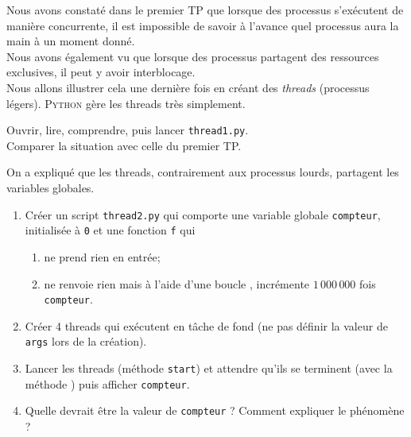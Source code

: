\documentclass[a4paper,12pt,french]{book}
\begin{document}

Nous avons constaté dans le premier TP que lorsque des processus s'exécutent de manière concurrente, il est impossible de savoir à l'avance quel processus aura la main à un moment donné.\\

Nous avons également vu que lorsque des processus partagent des ressources exclusives, il peut y avoir interblocage.\\

Nous allons illustrer cela une dernière fois en créant des \textit{threads} (processus légers). \textsc{Python} gère les threads très simplement.

\begin{exercice}[]
Ouvrir, lire, comprendre, puis lancer \texttt{thread1.py}.\\
Comparer la situation avec celle du premier TP.
\end{exercice}

\begin{exercice}[]
On a expliqué que les threads, contrairement aux processus \og lourds\fg{}, partagent les variables globales.
\begin{enumerate}[\bfseries 1.]
	\item 	Créer un script \texttt{thread2.py} qui comporte une variable globale \texttt{compteur}, initialisée à \texttt{0} et une fonction \texttt{f} qui
            \begin{enumerate}[--]
            	\item 	ne prend rien en entrée;
            	\item 	ne renvoie rien mais à l'aide d'une boucle , incrémente $1\,000\,000$ fois \texttt{compteur}.
            \end{enumerate}
	\item 	Créer 4 threads qui exécutent  en tâche de fond (ne pas définir la valeur de \texttt{args} lors de la création).
    \item 	Lancer les threads (méthode \texttt{start}) et attendre qu'ils se terminent (avec la méthode ) puis afficher \texttt{compteur}.
    \item 	Quelle devrait être la valeur de \texttt{compteur} ? Comment expliquer le phénomène ?
\end{enumerate}
\end{exercice}
\end{document}
